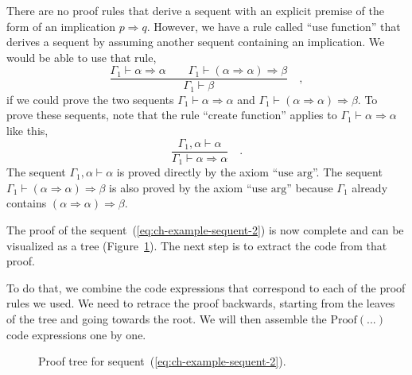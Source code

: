 There are no proof rules that derive a sequent with an explicit premise
of the form of an implication $p\Rightarrow q$. However, we have
a rule called \textsf{``}$\text{use function}$\textsf{''} that derives a sequent
by assuming another sequent containing an implication. We would be
able to use that rule,
\[
\frac{\Gamma_{1}\vdash\alpha\Rightarrow\alpha\quad\quad\Gamma_{1}\vdash(\alpha\Rightarrow\alpha)\Rightarrow\beta}{\Gamma_{1}\vdash\beta}\quad,
\]
if we could prove the two sequents $\Gamma_{1}\vdash\alpha\Rightarrow\alpha$
and $\Gamma_{1}\vdash(\alpha\Rightarrow\alpha)\Rightarrow\beta$.
To prove these sequents, note that the rule \textsf{``}$\text{create function}$\textsf{''}
applies to $\Gamma_{1}\vdash\alpha\Rightarrow\alpha$ like this,
\[
\frac{\Gamma_{1},\alpha\vdash\alpha}{\Gamma_{1}\vdash\alpha\Rightarrow\alpha}\quad.
\]
The sequent $\Gamma_{1},\alpha\vdash\alpha$ is proved directly by
the axiom \textsf{``}$\text{use arg}$\textsf{''}. The sequent $\Gamma_{1}\vdash(\alpha\Rightarrow\alpha)\Rightarrow\beta$
is also proved by the axiom \textsf{``}$\text{use arg}$\textsf{''} because $\Gamma_{1}$
already contains $(\alpha\Rightarrow\alpha)\Rightarrow\beta$.

The proof of the sequent~(\ref{eq:ch-example-sequent-2}) is now
complete and can be visualized as a tree (Figure~\ref{fig:Proof-of-the-sequent-example-2}).
The next step is to extract the code from that proof.

To do that, we combine the code expressions that correspond to each
of the proof rules we used. We need to retrace the proof backwards,
starting from the leaves of the tree and going towards the root. We
will then assemble the $\text{Proof}\left(...\right)$ code expressions
one by one.

\begin{figure}
\begin{centering}
{\footnotesize{}}%
\par\end{centering}
\caption{Proof tree for sequent~(\ref{eq:ch-example-sequent-2}).\label{fig:Proof-of-the-sequent-example-2}}
\end{figure}

